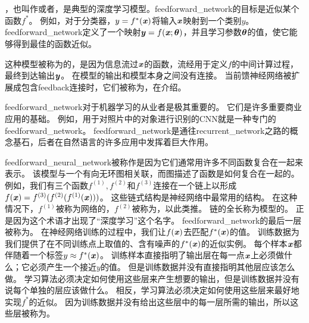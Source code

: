 \chapter{}
\label{chap:deep_feedforward_networks}

，也叫作或者，是典型的深度学习模型。\gls{feedforward_network}的目标是近似某个函数$f^*$。
例如，对于分类器，$y = f^*(\boldsymbol{\mathit{x}})$将输入$\boldsymbol{\mathit{x}}$映射到一个类别$y$。
\gls{feedforward_network}定义了一个映射$\boldsymbol{\mathit{y}} = f(\boldsymbol{\mathit{x}}; \boldsymbol{\theta})$，并且学习参数$\boldsymbol{\theta}$的值，使它能够得到最佳的函数近似。

这种模型被称为的，是因为信息流过$\boldsymbol{\mathit{x}}$的函数，流经用于定义$f$的中间计算过程，最终到达输出$\boldsymbol{\mathit{y}}$。
在模型的输出和模型本身之间没有连接。
当前馈神经网络被扩展成包含\gls{feedback}连接时，它们被称为，在介绍。

\gls{feedforward_network}对于机器学习的从业者是极其重要的。
它们是许多重要商业应用的基础。
例如，用于对照片中的对象进行识别的\gls{CNN}就是一种专门的\gls{feedforward_network}。
\gls{feedforward_network}是通往\gls{recurrent_network}之路的概念基石，后者在自然语言的许多应用中发挥着巨大作用。

\gls{feedforward_neural_network}被称作是因为它们通常用许多不同函数复合在一起来表示。
该模型与一个有向无环图相关联，而图描述了函数是如何复合在一起的。
例如，我们有三个函数$f^{(1)}, f^{(2)}$和$f^{(3)}$连接在一个链上以形成$f(\boldsymbol{\mathit{x}}) = f^{(3)}(f^{(2)}(f^{(1)}(\boldsymbol{\mathit{x}})) )$。
这些链式结构是神经网络中最常用的结构。
在这种情况下，$f^{(1)}$被称为网络的，$f^{(2)}$被称为，以此类推。
链的全长称为模型的。
正是因为这个术语才出现了``深度学习''这个名字。
\gls{feedforward_network}的最后一层被称为。
在神经网络训练的过程中，我们让$f(\boldsymbol{\mathit{x}})$去匹配$f^*(\boldsymbol{\mathit{x}})$的值。
训练数据为我们提供了在不同训练点上取值的、含有噪声的$f^*(\boldsymbol{\mathit{x}})$的近似实例。
每个样本$\boldsymbol{\mathit{x}}$都伴随着一个标签$y\approx f^*(\boldsymbol{\mathit{x}})$。
训练样本直接指明了输出层在每一点$\boldsymbol{\mathit{x}}$上必须做什么；它必须产生一个接近$y$的值。
但是训练数据并没有直接指明其他层应该怎么做。
学习算法必须决定如何使用这些层来产生想要的输出，但是训练数据并没有说每个单独的层应该做什么。
相反，学习算法必须决定如何使用这些层来最好地实现$f^*$的近似。
因为训练数据并没有给出这些层中的每一层所需的输出，所以这些层被称为。

